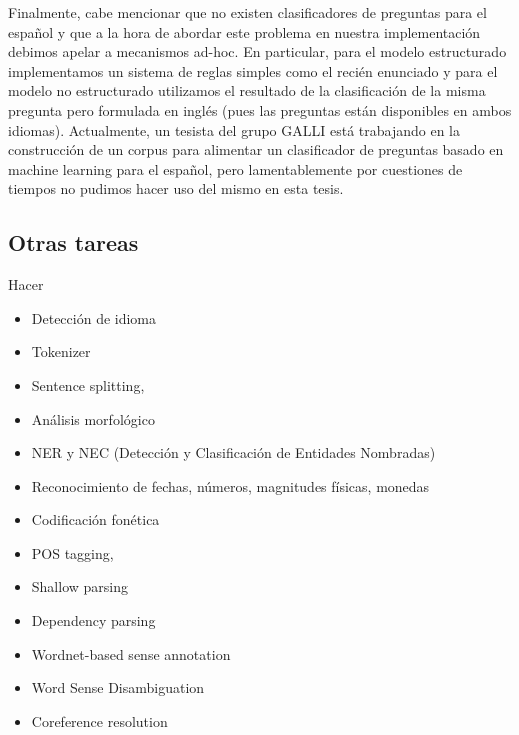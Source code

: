 Finalmente, cabe mencionar que no existen clasificadores de preguntas para el español y que a la hora de abordar este problema en nuestra implementación debimos apelar a mecanismos ad-hoc. En particular, para el modelo estructurado implementamos un sistema de reglas simples como el recién enunciado y para el modelo no estructurado utilizamos el resultado de la clasificación de la misma pregunta pero formulada en inglés (pues las preguntas están disponibles en ambos idiomas).
Actualmente, un tesista del grupo GALLI está trabajando en la construcción de un corpus para alimentar un clasificador de preguntas basado en machine learning para el español, pero lamentablemente por cuestiones de tiempos no pudimos hacer uso del mismo en esta tesis.


\subsection{Otras tareas}
Hacer
\begin{itemize}
\item Detecci\'on de idioma
\item Tokenizer
\item Sentence splitting,
\item Análisis morfol\'ogico
\item NER y NEC (Detecci\'on y Clasificaci\'on de Entidades Nombradas)
\item Reconocimiento de fechas, números, magnitudes físicas, monedas
\item Codificaci\'on fonética
\item POS tagging, 
\item Shallow parsing
\item Dependency parsing
\item Wordnet-based sense annotation
\item Word Sense Disambiguation
\item Coreference resolution
\end{itemize}

